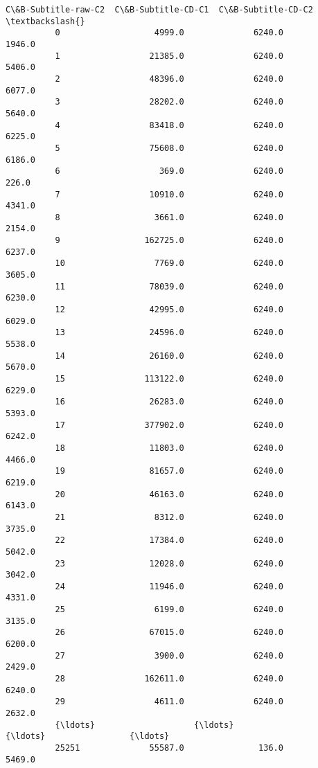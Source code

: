\documentclass[11pt]{article}
\begin{document}
\begin{Verbatim}[commandchars=\\\{\}]
                 C\&B-Subtitle-raw-C2  C\&B-Subtitle-CD-C1  C\&B-Subtitle-CD-C2  \textbackslash{}
          0                   4999.0              6240.0              1946.0   
          1                  21385.0              6240.0              5406.0   
          2                  48396.0              6240.0              6077.0   
          3                  28202.0              6240.0              5640.0   
          4                  83418.0              6240.0              6225.0   
          5                  75608.0              6240.0              6186.0   
          6                    369.0              6240.0               226.0   
          7                  10910.0              6240.0              4341.0   
          8                   3661.0              6240.0              2154.0   
          9                 162725.0              6240.0              6237.0   
          10                  7769.0              6240.0              3605.0   
          11                 78039.0              6240.0              6230.0   
          12                 42995.0              6240.0              6029.0   
          13                 24596.0              6240.0              5538.0   
          14                 26160.0              6240.0              5670.0   
          15                113122.0              6240.0              6229.0   
          16                 26283.0              6240.0              5393.0   
          17                377902.0              6240.0              6242.0   
          18                 11803.0              6240.0              4466.0   
          19                 81657.0              6240.0              6219.0   
          20                 46163.0              6240.0              6143.0   
          21                  8312.0              6240.0              3735.0   
          22                 17384.0              6240.0              5042.0   
          23                 12028.0              6240.0              3042.0   
          24                 11946.0              6240.0              4331.0   
          25                  6199.0              6240.0              3135.0   
          26                 67015.0              6240.0              6200.0   
          27                  3900.0              6240.0              2429.0   
          28                162611.0              6240.0              6240.0   
          29                  4611.0              6240.0              2632.0   
          {\ldots}                    {\ldots}                 {\ldots}                 {\ldots}   
          25251              55587.0               136.0              5469.0   

\end{Verbatim}
\end{document}
